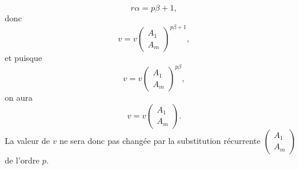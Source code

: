 \documentclass[oneside, 12 pt, leqno]{memoir}
\begin{document}
\[r \alpha=p \beta+1,\]
donc
\[v=v\left(\begin{array}{l}A_1 \\A_m\end{array}\right)^{p \beta+1},\]
et puisque
\[v=v\left(\begin{array}{l}A_1 \\A_m\end{array}\right)^{p \beta},\]
on aura
\[v=v\left(\begin{array}{l}A_1 \\A_m\end{array}\right).\]
La valeur de \(v\) ne sera donc pas changée par la substitution récurrente \(\left(\begin{array}{l}A_1 \\ A_m\end{array}\right)\) de l'ordre \(p\).
\end{document}
